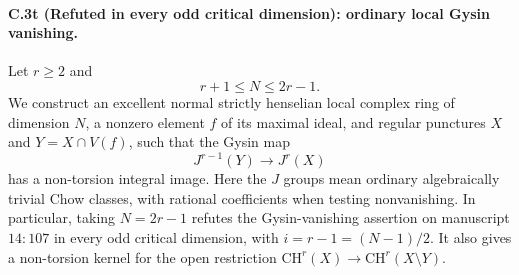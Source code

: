 \paragraph{C.3t (Refuted in every odd critical dimension): ordinary local Gysin vanishing.}
Let $r\ge2$ and
\[
                         r+1\le N\le2r-1.
\]
We construct an excellent normal strictly henselian local complex
ring of dimension $N$, a nonzero element $f$ of its maximal ideal,
and regular punctures $X$ and $Y=X\cap V(f)$, such that the Gysin map
\[
             J^{r-1}(Y)\longrightarrow J^r(X)
\]
has a non-torsion integral image. Here the $J$ groups mean ordinary
algebraically trivial Chow classes, with rational coefficients when
testing nonvanishing. In particular, taking $N=2r-1$ refutes the
Gysin-vanishing assertion on manuscript $14{:}107$ in every odd
critical dimension, with $i=r-1=(N-1)/2$. It also gives a non-torsion
kernel for the open restriction
$\mathrm{CH}^r(X)\to\mathrm{CH}^r(X\setminus Y)$.

